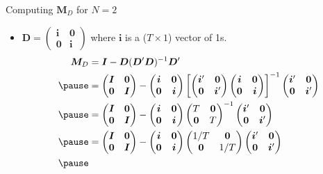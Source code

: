 \documentclass[aspectratio=169, handout]{beamer}
\numberwithin{equation}{section}
\begin{document}
\begin{frame}{Computing $\bm{M}_D$ for $N=2$}
\begin{itemize}
\item $\bm{D}=\begin{pmatrix} \bm{i}&\bm{0}\\\bm{0}&\bm{i}\end{pmatrix}$ where $\bm{i}$ is a ($T\times 1$) vector of 1s.\pause
\begin{align*}
\bm{M}_D&=\bm{I}-\bm{D}(\bm{D}'\bm{D})^{-1}\bm{D}'\\\pause
&=\begin{pmatrix} \bm{I}&\bm{0}\\\bm{0}&\bm{I}\end{pmatrix}-\begin{pmatrix} \bm{i}&\bm{0}\\\bm{0}&\bm{i}\end{pmatrix}\left[\begin{pmatrix} \bm{i}'&\bm{0}\\\bm{0}&\bm{i}'\end{pmatrix}\begin{pmatrix} \bm{i}&\bm{0}\\\bm{0}&\bm{i}\end{pmatrix}\right]^{-1}\begin{pmatrix} \bm{i}'&\bm{0}\\\bm{0}&\bm{i}'\end{pmatrix}\\\pause
&=\begin{pmatrix} \bm{I}&\bm{0}\\\bm{0}&\bm{I}\end{pmatrix}-\begin{pmatrix} \bm{i}&\bm{0}\\\bm{0}&\bm{i}\end{pmatrix}\begin{pmatrix}T&\bm{0}\\\bm{0}&T\end{pmatrix}^{-1}\begin{pmatrix} \bm{i}'&\bm{0}\\\bm{0}&\bm{i}'\end{pmatrix}\\\pause
&=\begin{pmatrix} \bm{I}&\bm{0}\\\bm{0}&\bm{I}\end{pmatrix}-\begin{pmatrix} \bm{i}&\bm{0}\\\bm{0}&\bm{i}\end{pmatrix}\begin{pmatrix} 1/T&\bm{0}\\\bm{0}&1/T\end{pmatrix}\begin{pmatrix} \bm{i}'&\bm{0}\\\bm{0}&\bm{i}'\end{pmatrix}\\\pause

\end{align*}
\end{itemize}
\end{frame}
\end{document}

